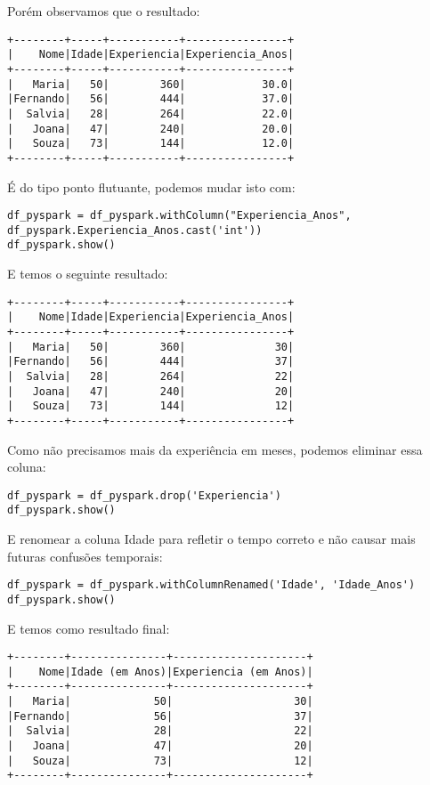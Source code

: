 Porém observamos que o resultado: \vspace{-1.5em}
\begin{verbatim}
+--------+-----+-----------+----------------+
|    Nome|Idade|Experiencia|Experiencia_Anos|
+--------+-----+-----------+----------------+
|   Maria|   50|        360|            30.0|
|Fernando|   56|        444|            37.0|
|  Salvia|   28|        264|            22.0|
|   Joana|   47|        240|            20.0|
|   Souza|   73|        144|            12.0|
+--------+-----+-----------+----------------+
\end{verbatim}

É do tipo ponto flutuante, podemos mudar isto com:
\begin{lstlisting}[]
df_pyspark = df_pyspark.withColumn("Experiencia_Anos", df_pyspark.Experiencia_Anos.cast('int'))
df_pyspark.show()
\end{lstlisting}

E temos o seguinte resultado: \vspace{-1.5em}
\begin{verbatim}
+--------+-----+-----------+----------------+
|    Nome|Idade|Experiencia|Experiencia_Anos|
+--------+-----+-----------+----------------+
|   Maria|   50|        360|              30|
|Fernando|   56|        444|              37|
|  Salvia|   28|        264|              22|
|   Joana|   47|        240|              20|
|   Souza|   73|        144|              12|
+--------+-----+-----------+----------------+
\end{verbatim}

Como não precisamos mais da experiência em meses, podemos eliminar essa coluna:
\begin{lstlisting}[]
df_pyspark = df_pyspark.drop('Experiencia')
df_pyspark.show()
\end{lstlisting}

E renomear a coluna Idade para refletir o tempo correto e não causar mais futuras confusões temporais:
\begin{lstlisting}[]
df_pyspark = df_pyspark.withColumnRenamed('Idade', 'Idade_Anos')
df_pyspark.show()
\end{lstlisting}

E temos como resultado final: \vspace{-1.5em}
\begin{verbatim}
+--------+---------------+---------------------+
|    Nome|Idade (em Anos)|Experiencia (em Anos)|
+--------+---------------+---------------------+
|   Maria|             50|                   30|
|Fernando|             56|                   37|
|  Salvia|             28|                   22|
|   Joana|             47|                   20|
|   Souza|             73|                   12|
+--------+---------------+---------------------+
\end{verbatim}

